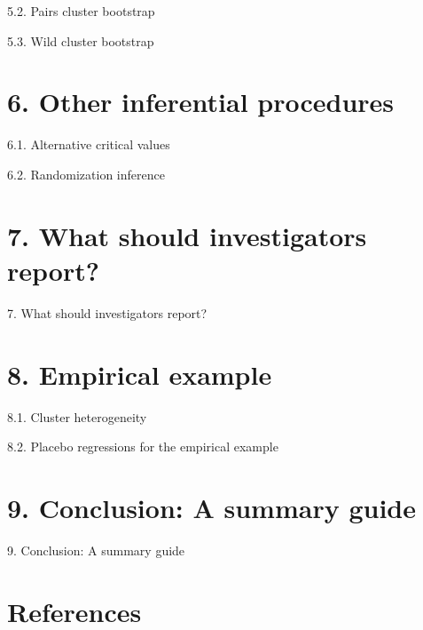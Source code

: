 \documentclass[xcolor=svgnames,aspectratio=169]{beamer}
\begin{document}
\begin{frame}{5.2. Pairs cluster bootstrap}
\end{frame}

\begin{frame}{5.3. Wild cluster bootstrap}
\end{frame}

\section{6. Other inferential procedures}

\begin{frame}{6.1. Alternative critical values}
\end{frame}

\begin{frame}{6.2. Randomization inference}
\end{frame}

\section{7. What should investigators report?}

\begin{frame}{7. What should investigators report?}
\end{frame}

\section{8. Empirical example}

\begin{frame}{8.1. Cluster heterogeneity}
\end{frame}

\begin{frame}{8.2. Placebo regressions for the empirical example}
\end{frame}

\section{9. Conclusion: A summary guide}

\begin{frame}{9. Conclusion: A summary guide}
\end{frame}

\section{References}
\end{document}
